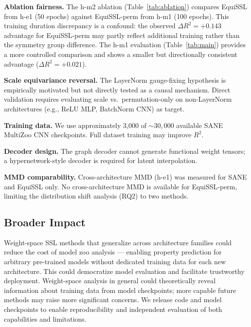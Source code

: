 \textbf{Ablation fairness.}
The h-m2 ablation (Table~\ref{tab:ablation}) compares EquiSSL from h-e1 (50 epochs)
against EquiSSL-perm from h-m1 (100 epochs).
This training duration discrepancy is a confound:
the observed $\Delta R^2 = +0.143$ advantage for EquiSSL-perm may partly reflect additional
training rather than the symmetry group difference.
The h-m1 evaluation (Table~\ref{tab:main}) provides a more controlled comparison
and shows a smaller but directionally consistent advantage ($\Delta R^2 = +0.021$).

\textbf{Scale equivariance reversal.}
The LayerNorm gauge-fixing hypothesis is empirically motivated but not directly tested as a
causal mechanism.
Direct validation requires evaluating scale vs.\ permutation-only on non-LayerNorm
architectures (e.g., ReLU MLP, BatchNorm CNN) as target.

\textbf{Training data.}
We use approximately 3{,}000 of ${\sim}30{,}000$ available SANE MultiZoo CNN checkpoints.
Full dataset training may improve $R^2$.

\textbf{Decoder design.}
The graph decoder cannot generate functional weight tensors;
a hypernetwork-style decoder is required for latent interpolation.

\textbf{MMD comparability.}
Cross-architecture MMD (h-e1) was measured for SANE and EquiSSL only.
No cross-architecture MMD is available for EquiSSL-perm,
limiting the distribution shift analysis (RQ2) to two methods.

\subsection*{Broader Impact}

Weight-space SSL methods that generalize across architecture families could reduce the cost
of model zoo analysis --- enabling property prediction for arbitrary pre-trained models
without dedicated training data for each new architecture.
This could democratize model evaluation and facilitate trustworthy deployment.
Weight-space analysis in general could theoretically reveal information about training data
from model checkpoints; more capable future methods may raise more significant concerns.
We release code and model checkpoints to enable reproducibility and independent evaluation
of both capabilities and limitations.
